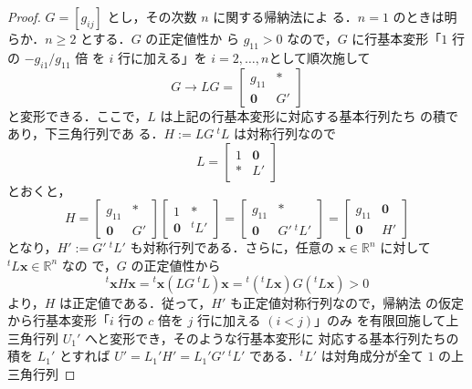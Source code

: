 \documentclass[11pt, uplatex, dvipdfmx]{jsarticle}
\theoremstyle{definition}
\begin{document}
\begin{proof}

  $G=\left[ g_{ij}\right]$ とし，その次数 $n$ に関する帰納法によ
  る．$n=1$ のときは明らか．$n \geq 2$ とする．$G$ の正定値性か
  ら $g_{11} >0$ なので，$G$ に行基本変形「$1$ 行の $-g_{i1}/g_{11}$ 倍
  を $i$ 行に加える」を $i=2, \ldots, n$として順次施して
  \[
   G \to L G=\left[
      \begin{array}{cc}
        g_{11} & \bm{\ast}\\
        \bm{0} & G'
      \end{array}
    \right]
  \]
  と変形できる．ここで，$L$ は上記の行基本変形に対応する基本行列たち
  の積であり，下三角行列であ
  る．$H:=L G~{}^{t}L$ は対称行列なので
  \[
    L = \left[
      \begin{array}{cc}
        1 & \bm{0}\\
        \bm{\ast} & L'
      \end{array}
    \right]
  \]
  とおくと，
  \[
    H = \left[
      \begin{array}{cc}
        g_{11}  & \ast \\
        \bm{0} & G'
      \end{array}
    \right] \left[
      \begin{array}{cc}
        1 & \ast\\
        \bm{0} & {}^{t}L'
      \end{array}
    \right] = \left[
      \begin{array}{cc}
        g_{11} & \ast\\
        \bm{0} & G'~{}^{t}L'
      \end{array}
    \right] = \left[
      \begin{array}{cc}
        g_{11} & \bm{0}\\
        \bm{0} & H'
      \end{array}
    \right]
  \]
  となり，$H':=G'~{}^{t}L'$ も対称行列である．さらに，任意の $\bm{x} \in
  \mathbb{R}^n$ に対して ${}^{t}L \bm{x} \in \mathbb{R}^n$ なの
  で，$G$ の正定値性から
  \[
    {}^{t}\bm{x} H \bm{x} = 
    {}^{t}\bm{x}\left( L G~ {}^{t}L \right)\bm{x} = {}^{t}\left(
      {}^{t}L \bm{x}\right) G \left({}^{t}L \bm{x}\right) >0
  \]
  より，$H$ は正定値である．従って，$H'$ も正定値対称行列なので，帰納法
  の仮定から行基本変形「$i$ 行の $c$ 倍を $j$ 行に加える $(i<j)$」のみ
  を有限回施して上三角行列 $U_1'$ へと変形でき，そのような行基本変形に
  対応する基本行列たちの積を $L_1'$ とすれば $U'=L_1'H' =
  L_1'G'~{}^{t}L'$ である．${}^{t}L'$ は対角成分が全て $1$ の上三角行列

\end{proof}
\end{document}
